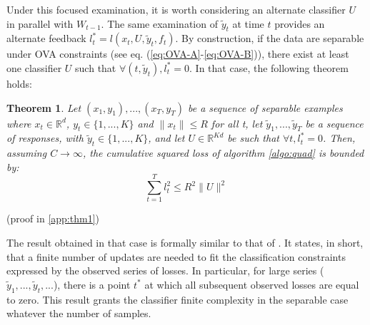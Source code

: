 \documentclass[preprint,12pt,authoryear]{elsarticle}
\newtheorem{theorem}{Theorem}
\begin{document}
Under this focused examination, it is worth considering an alternate classifier $U$ in parallel with $W_{t-1}$. The same examination of $\tilde{y}_t$ at time $t$ provides an alternate feedback $l^*_t = l(x_t,U,\tilde{y}_t,f_t)$. By construction, if the data are separable under OVA constraints (see eq. (\ref{eq:OVA-A}-\ref{eq:OVA-B})), there exist at least one classifier $U$ such that $\forall (t, \tilde{y}_t), l^*_t = 0$. In that case, the following theorem holds:




\begin{theorem}
	\label{theo:BPAT1}
	Let $(x_1,y_1),...,(x_T,y_T)$ be a sequence of separable examples where $x_t \in \mathbb{R}^d$, $y_t\in \{1,...,K\}$ and $\parallel x_t\parallel\leqslant R$ for all t, let $\tilde{y}_1,...,\tilde{y}_T$ be a sequence of responses, with $\tilde{y}_t\in \{1,...,K\}$, 
	and let $U \in \mathbb{R}^{K d}$ be such that $ \forall t, l^*_t=0$. Then, assuming $C \rightarrow \infty$, the cumulative squared loss of algorithm \ref{algo:quad} is bounded by:
	\begin{equation}
	\sum_{t=1}^{T} l_t^2 \leqslant R^2 \parallel{U}\parallel^2
	\end{equation}
\end{theorem}
(proof in \ref{app:thm1})

The result obtained in that case is formally similar to that of  \cite{crammer2006online}. It states, in short, that a finite number of updates are needed to fit the classification constraints expressed by the observed series of losses. In particular, for large series ($\tilde{y}_1, ...,\tilde{y}_t, ...$), there is a point $t^*$ at which all subsequent observed losses are equal to zero. This result grants the classifier finite complexity in the separable case whatever the number of samples.
\end{document}
